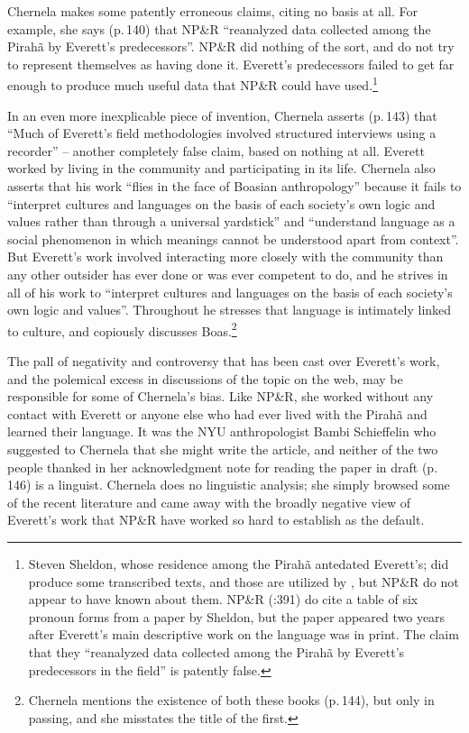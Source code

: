 \documentclass[output=paper,colorlinks,citecolor=brown
]{langscibook}
\begin{document}
Chernela makes some patently erroneous claims, citing no basis at all.
For example, she says (p.\,140) that NP\&R ``reanalyzed data collected
among the Pirah{\~a} by Everett's predecessors''. NP\&R did nothing of
the sort, and do not try to represent themselves as having done it.
Everett's predecessors failed to get far enough to produce much
useful data that NP\&R could have used.\footnote{%
   Steven Sheldon, whose residence among the Pirah{\~a} antedated
   Everett's; did produce some transcribed texts, and those are
   utilized by \citet{FutrellEtAl16}, but NP\&R do not appear to have
   known about them. NP\&R (\citeyear{NevPesRod09a}:391) do cite a
   table of six pronoun forms from a paper by Sheldon, but the paper
   \citep{Sheldon88} appeared two years after Everett's main
   descriptive work on the language was in print. The claim that they
   ``reanalyzed data collected among the Pirah{\~a} by Everett's
   predecessors in the field'' is patently false.}

In an even more inexplicable piece of invention, Chernela asserts
(p.\,143) that ``Much of Everett's field methodologies involved
structured interviews using a recorder'' -- another completely false
claim, based on nothing at all. Everett worked by living in the
community and participating in its life. Chernela also asserts that
his work ``flies in the face of Boasian anthropology'' because it fails
to ``interpret cultures and languages on the basis of each society's
own logic and values rather than through a universal yardstick'' and
``understand language as a social phenomenon in which meanings cannot
be understood apart from context''. But Everett's work involved
interacting more closely with the community than any other outsider
has ever done or was ever competent to do, and he strives in all of
his work to ``interpret cultures and languages on the basis of each
society's own logic and values''. Throughout \citet{Everett12} he
stresses that language is intimately linked to culture, and
\citet{Everett16} copiously discusses Boas.\footnote{%
   Chernela mentions the existence of both these books (p.\,144), but
   only in passing, and she misstates the title of the first.}

The pall of negativity and controversy that has been cast over
Everett's work, and the polemical excess in discussions of the topic
on the web, may be responsible for some of Chernela's bias. Like
NP\&R, she worked without any contact with Everett or anyone else
who had ever lived with the Pirah{\~a} and learned their language.
It was the NYU anthropologist Bambi Schieffelin who suggested to
Chernela that she might write the article, and neither of the two
people thanked in her acknowledgment note for reading the paper in
draft (p.\,146) is a linguist. Chernela does no linguistic analysis;
she simply browsed some of the recent literature and came away with
the broadly negative view of Everett's work that NP\&R have worked
so hard to establish as the default.
\end{document}
